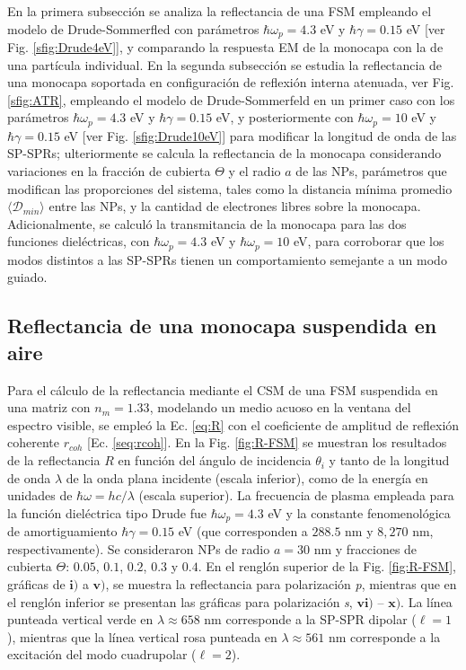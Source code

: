  En la primera subsección se analiza la reflectancia de una FSM empleando el modelo de Drude-Sommerfled con parámetros $\hbar\omega_p = 4.3$ eV y  $\hbar\gamma = 0.15$ eV [ver Fig. \ref{sfig:Drude4eV}], y comparando la respuesta EM de la monocapa con la de una partícula individual. En la segunda subsección se estudia la reflectancia de una monocapa soportada en configuración de reflexión interna atenuada, ver Fig. \ref{sfig:ATR}, empleando el modelo de Drude-Sommerfeld en un primer caso con los parámetros  $\hbar\omega_p = 4.3$ eV y  $\hbar\gamma = 0.15$ eV, y posteriormente con $\hbar\omega_p = 10$ eV y $\hbar\gamma = 0.15$ eV [ver Fig. \ref{sfig:Drude10eV}] para modificar la longitud de onda de las SP-SPRs; ulteriormente se calcula la reflectancia de la monocapa considerando  variaciones en la fracción de cubierta $\Theta$ y el radio $a$ de las NPs, parámetros que modifican las proporciones del sistema, tales como la distancia mínima promedio $\langle\mathscr{D}_{min}\rangle $ entre las NPs, y la cantidad de electrones libres sobre la monocapa. Adicionalmente, se calculó la transmitancia de la monocapa para las dos funciones dieléctricas, con $\hbar\omega_p =4.3$ eV y $\hbar\omega_p =10$ eV, para corroborar que los modos distintos a las SP-SPRs tienen un comportamiento semejante a un modo guiado. 
	
	\subsection{Reflectancia de una monocapa suspendida en aire}
	\label{ssection:DrudeFSM}
	
	
Para el cálculo de la reflectancia mediante el CSM de una FSM suspendida en una matriz con $n_m=1.33$, modelando un medio acuoso en la ventana del espectro visible, se empleó la Ec.  \eqref{eq:R} con el coeficiente de amplitud de reflexión coherente $r_{coh}$ [Ec.  \eqref{seq:rcoh}].  En la Fig.  \ref{fig:R-FSM} se muestran los resultados de la reflectancia $R$ en función del ángulo de incidencia $\theta_i$ y tanto de la longitud de onda $\lambda$ de la onda plana incidente (escala inferior), como de la energía en unidades de $\hbar\omega = h c /\lambda$ (escala superior).  La frecuencia de plasma empleada para la función dieléctrica tipo Drude fue $\hbar\omega_p = 4. 3$ eV y la constante fenomenológica de amortiguamiento $\hbar\gamma = 0. 15$ eV (que corresponden a $288. 5$ nm  y $8,270$ nm, respectivamente). Se consideraron NPs de radio $a=30$ nm y fracciones de cubierta $\Theta$: $0. 05$, $0. 1$, $0. 2$, $0. 3$ y $0. 4$. En el renglón superior de la Fig. \ref{fig:R-FSM}, gráficas de $\mathbf{i)}$ a $\mathbf{v)}$, se muestra la reflectancia para polarización \emph{p}, mientras que en el renglón inferior se presentan las gráficas para polarización \emph{s}, $\mathbf{vi)}$ -- $\mathbf{x)}$. La línea punteada vertical verde  en $\lambda \approx 658$ nm corresponde a la SP-SPR dipolar ($\ell = 1$), mientras que la línea vertical rosa punteada en $\lambda \approx 561$ nm corresponde a la excitación del modo cuadrupolar ($\ell=2$).
					

